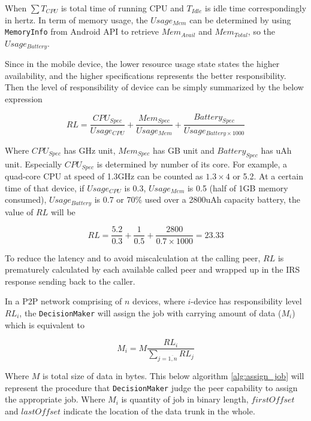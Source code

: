\documentclass[conference]{IEEEtran}
\begin{document}
When $\sum{T_{CPU}}$ is total time of running CPU and $T_{Idle}$ is idle time correspondingly in hertz. In term of memory usage, the $Usage_{Mem}$ can be determined by using \texttt{MemoryInfo} from Android API to retrieve $Mem_{Avail}$ and $Mem_{Total}$, so the $Usage_{Battery}$.

Since in the mobile device, the lower resource usage state states the higher availability, and the higher specifications represents the better responsibility. Then the level of responsibility of device can be simply summarized by the below expression

\begin{equation}
\label{eq:res_level}
RL = \frac{CPU_{Spec}}{Usage_{CPU}} + \frac{Mem_{Spec}}{Usage_{Mem}} + \frac{Battery_{Spec}}{Usage_{Battery \times 1000}}
\end{equation}

Where $CPU_{Spec}$ has GHz unit, $Mem_{Spec}$ has GB unit and $Battery_{Spec}$ has uAh unit. Especially $CPU_{Spec}$ is determined by number of its core. For example, a quad-core CPU at speed of 1.3GHz can be counted as $1.3 \times 4$ or 5.2. At a certain time of that device, if $Usage_{CPU}$ is 0.3, $Usage_{Mem}$ is 0.5 (half of 1GB memory consumed), $Usage_{Battery}$ is 0.7 or 70\% used over a 2800uAh capacity battery, the value of $RL$ will be

$$RL = \frac{5.2}{0.3} + \frac{1}{0.5} + \frac{2800}{0.7 \times 1000} = 23.33$$

To reduce the latency and to avoid miscalculation at the calling peer, $RL$ is prematurely calculated by each available called peer and wrapped up in the IRS response sending back to the caller. 

In a P2P network comprising of $n$ devices, where $i$-device has responsibility level $RL_{i}$, the \texttt{DecisionMaker} will assign the job with carrying amount of data ($M_{i}$) which is equivalent to

\begin{equation}
\label{eq:data_amount}
M_{i} = M\frac{RL_{i}}{\sum_{j = \overline{1,n}}{RL_{j}}}
\end{equation}

Where $M$ is total size of data in bytes. This below algorithm \ref{alg:assign_job} will represent the procedure that \texttt{DecisionMaker} judge the peer capability to assign the appropriate job. Where $M_{i}$ is quantity of job in binary length, $firstOffset$ and $lastOffset$ indicate the location of the data trunk in the whole.
\end{document}
